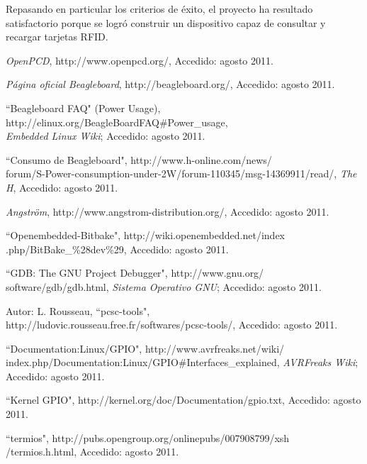 \documentclass[%
        final,
        notitlepage,
        narroweqnarray,
        inline,
        ]{ieee}
\begin{document}
Repasando en particular los criterios de éxito, el proyecto ha resultado satisfactorio
porque se logró construir un dispositivo capaz de consultar y recargar tarjetas RFID.




%
%
\begin{thebibliography}{15}

 \textit{OpenPCD}, http://www.openpcd.org/, Accedido: agosto 2011.

 \textit{Página oficial Beagleboard}, http://beagleboard.org/, Accedido: agosto 2011.

 ``Beagleboard FAQ" (Power Usage),\\
 http://elinux.org/BeagleBoardFAQ\#Power\_usage,\\
 \textit{Embedded Linux Wiki}; Accedido: agosto 2011.

 ``Consumo de Beagleboard", http://www.h-online.com/news/\\
forum/S-Power-consumption-under-2W/forum-110345/msg-14369911/read/, \textit{The H}, Accedido: agosto 2011.

 \textit{Angström}, http://www.angstrom-distribution.org/, Accedido: agosto 2011.

 ``Openembedded-Bitbake", http://wiki.openembedded.net/index\\
.php/BitBake\_\%28dev\%29, Accedido: agosto 2011.

 ``GDB: The GNU Project Debugger", http://www.gnu.org/\\
software/gdb/gdb.html, \textit{Sistema Operativo GNU}; Accedido: agosto 2011.

 Autor: L. Rousseau, ``pcsc-tools", \\
http://ludovic.rousseau.free.fr/softwares/pcsc-tools/, Accedido: agosto 2011.

 ``Documentation:Linux/GPIO", http://www.avrfreaks.net/wiki/\\
index.php/Documentation:Linux/GPIO\#Interfaces\_explained, \textit{AVRFreaks Wiki}; Accedido: agosto 2011.

 ``Kernel GPIO", http://kernel.org/doc/Documentation/gpio.txt, Accedido: agosto 2011.

 ``termios", http://pubs.opengroup.org/onlinepubs/007908799/xsh\\
/termios.h.html, Accedido: agosto 2011.


\end{thebibliography}
\end{document}
